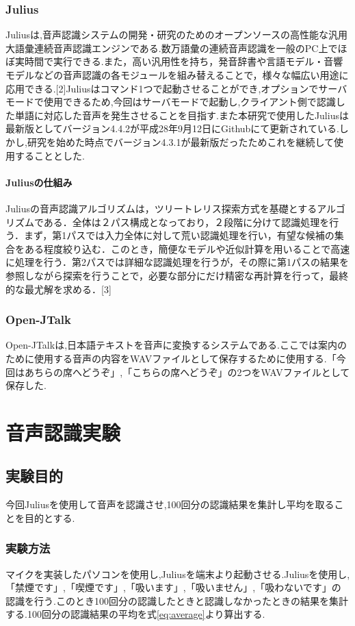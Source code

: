 \documentclass[12pt,oneside]{sotsuken_paper}
\begin{document}
\subsection{Julius}
Juliusは,音声認識システムの開発・研究のためのオープンソースの高性能な汎用大語彙連続音声認識エンジンである.数万語彙の連続音声認識を一般のPC上でほぼ実時間で実行できる.また，高い汎用性を持ち，発音辞書や言語モデル・音響モデルなどの音声認識の各モジュールを組み替えることで，様々な幅広い用途に応用できる.[2]Juliusはコマンド1つで起動させることができ,オプションでサーバモードで使用できるため,今回はサーバモードで起動し,クライアント側で認識した単語に対応した音声を発生させることを目指す.また本研究で使用したJuliusは最新版としてバージョン4.4.2が平成28年9月12日にGithubにて更新されている.しかし,研究を始めた時点でバージョン4.3.1が最新版だったためこれを継続して使用することとした.

\subsubsection{Juliusの仕組み}
Juliusの音声認識アルゴリズムは，ツリートレリス探索方式を基礎とするアルゴリズムである．全体は２パス構成となっており，２段階に分けて認識処理を行う．まず，第1パスでは入力全体に対して荒い認識処理を行い，有望な候補の集合をある程度絞り込む．このとき，簡便なモデルや近似計算を用いることで高速に処理を行う．第2パスでは詳細な認識処理を行うが，その際に第1パスの結果を参照しながら探索を行うことで，必要な部分にだけ精密な再計算を行って，最終的な最尤解を求める．[3]


\subsection{Open-JTalk}
Open-JTalkは,日本語テキストを音声に変換するシステムである.ここでは案内のために使用する音声の内容をWAVファイルとして保存するために使用する.「今回はあちらの席へどうぞ」,「こちらの席へどうぞ」の2つをWAVファイルとして保存した.


\chapter{音声認識実験}
\section{実験目的}
今回Juliusを使用して音声を認識させ,100回分の認識結果を集計し平均を取ることを目的とする.


\subsection{実験方法}
マイクを実装したパソコンを使用し,Juliusを端末より起動させる.Juliusを使用し,「禁煙です」,「喫煙です」,「吸います」,「吸いません」,「吸わないです」の認識を行う.このとき100回分の認識したときと認識しなかったときの結果を集計する.100回分の認識結果の平均を式\ref{eq:average}より算出する.
\end{document}
